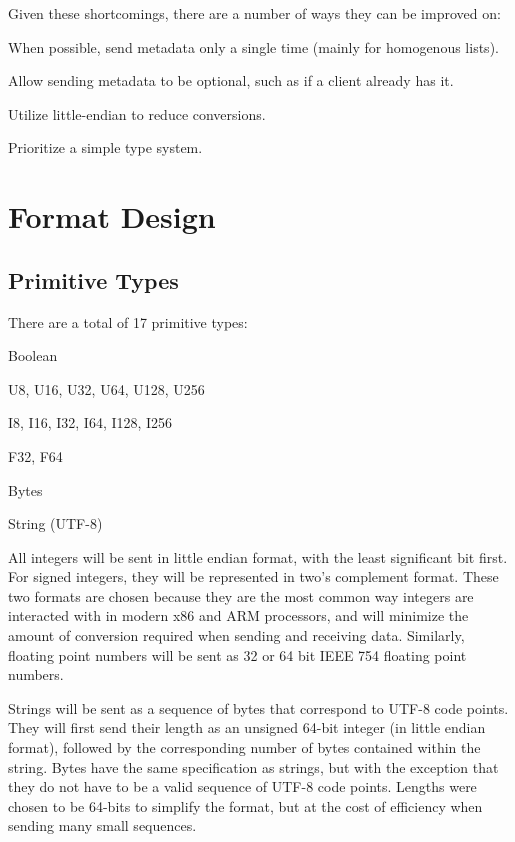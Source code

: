 \documentclass[conference]{IEEEtran}
\begin{document}
Given these shortcomings, there are a number of ways they can be improved on:

\begin{IEEEitemize}
	\item When possible, send metadata only a single time (mainly for homogenous lists).
	\item Allow sending metadata to be optional, such as if a client already has it.
	\item Utilize little-endian to reduce conversions.
	\item Prioritize a simple type system.
\end{IEEEitemize}

\section{Format Design}

\subsection{Primitive Types}

There are a total of 17  primitive types:

\begin{IEEEitemize}
	\item Boolean
	\item U8, U16, U32, U64, U128, U256
	\item I8, I16, I32, I64, I128, I256
	\item F32, F64
	\item Bytes
	\item String (UTF-8)
\end{IEEEitemize}

All integers will be sent in little endian format, with the least significant bit first. For signed integers, they will be represented in two's complement format. These two formats are chosen because they are the most common way integers are interacted with in modern x86 and ARM processors, and will minimize the amount of conversion required when sending and receiving data. Similarly, floating point numbers will be sent as 32 or 64 bit IEEE 754 floating point numbers.

Strings will be sent as a sequence of bytes that correspond to UTF-8 code points. They will first send their length as an unsigned 64-bit integer (in little endian format), followed by the corresponding number of bytes contained within the string. Bytes have the same specification as strings, but with the exception that they do not have to be a valid sequence of UTF-8 code points. Lengths were chosen to be 64-bits to simplify the format, but at the cost of efficiency when sending many small sequences.
\end{document}
